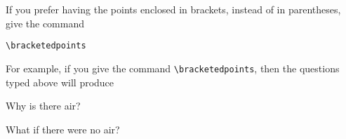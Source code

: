 \documentclass[12pt]{exam}
\begin{document}
If you prefer having the points enclosed in brackets, instead of in
parentheses, give the command
\begin{center}
  \verb"\bracketedpoints"
\end{center}
For example, if you give the command \verb"\bracketedpoints", then the
questions typed above will produce
%
\nopointsinmargin
\bracketedpoints
\begin{questions}
\question[20]
Why is there air?


\question
What if there were no air?


\end{questions}
%
\end{document}
